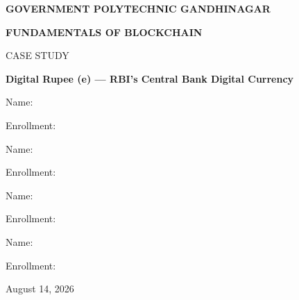 
\thispagestyle{empty}
\begin{center}
    \vspace*{2cm}
    {\LARGE \bfseries GOVERNMENT POLYTECHNIC GANDHINAGAR\par}
    \vspace{1.5cm}
    {\Large \bfseries FUNDAMENTALS OF BLOCKCHAIN\par}
    \vspace{0.5cm}
    {\Large CASE STUDY\par}
    \vspace{1cm}
    {\LARGE \bfseries Digital Rupee (e\textrupee) — RBI's Central Bank Digital Currency\par}
    \vspace{2cm}
    \begin{minipage}{0.45\textwidth}
        \centering
        Name: \underline{\hspace{4cm}}\par\vspace{0.5cm}
        Enrollment: \underline{\hspace{4cm}}
    \end{minipage}
    \hfill
    \begin{minipage}{0.45\textwidth}
        \centering
        Name: \underline{\hspace{4cm}}\par\vspace{0.5cm}
        Enrollment: \underline{\hspace{4cm}}
    \end{minipage}
    
    \vspace{1cm}
    
    \begin{minipage}{0.45\textwidth}
        \centering
        Name: \underline{\hspace{4cm}}\par\vspace{0.5cm}
        Enrollment: \underline{\hspace{4cm}}
    \end{minipage}
    \hfill
    \begin{minipage}{0.45\textwidth}
        \centering
        Name: \underline{\hspace{4cm}}\par\vspace{0.5cm}
        Enrollment: \underline{\hspace{4cm}}
    \end{minipage}
    \vspace{2cm}
    {\large August 14, 2026\par}
    \vfill
\end{center}
\newpage
\tableofcontents
\newpage
